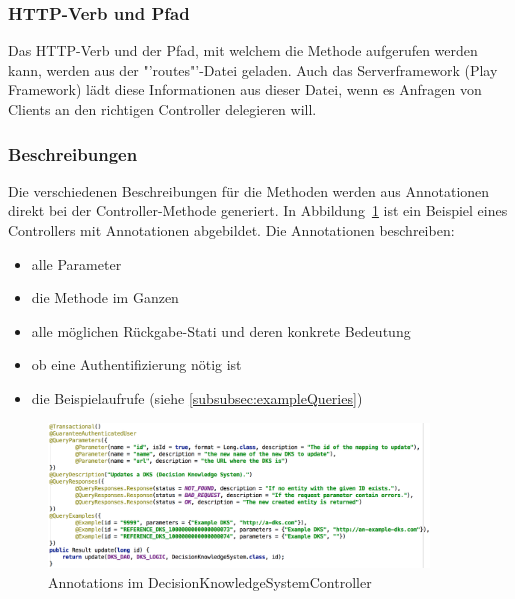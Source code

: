 		\subsubsection{HTTP-Verb und Pfad}
			Das HTTP-Verb und der Pfad, mit welchem die Methode aufgerufen werden kann,
			werden aus der "'routes"'-Datei geladen.
			Auch das Serverframework (Play Framework) lädt diese Informationen aus dieser Datei,
			wenn es Anfragen von Clients an den richtigen Controller delegieren will.
			
		\subsubsection{Beschreibungen}
			Die verschiedenen Beschreibungen für die Methoden werden aus Annotationen direkt bei der Controller-Methode generiert.
			In Abbildung\ \ref{fig:apiAnnotations} ist ein Beispiel eines Controllers mit Annotationen abgebildet.
			Die Annotationen beschreiben:
			\begin{itemize}
				\item{alle Parameter}
				\item{die Methode im Ganzen}
				\item{alle möglichen Rückgabe-Stati und deren konkrete Bedeutung}
				\item{ob eine Authentifizierung nötig ist}
				\item{die Beispielaufrufe (siehe \ref{subsubsec:exampleQueries})}
			\end{itemize}
			\begin{figure}[H]
				\includegraphics[width=0.9\textwidth]{interfacesAndProtocols/media/img/apiAnnotations.png}
				\centering
				\caption{Annotations im DecisionKnowledgeSystemController}
				\label{fig:apiAnnotations}
			\end{figure}
			
